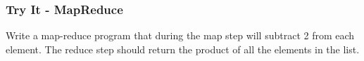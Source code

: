 \documentclass[xcolor=svgnames, handout]{beamer}
\newcommand{\red}[1]{\textcolor{red}{#1}}
\newcommand{\ft}[1]{\frametitle{#1}}
\begin{document}
%
%
%
%
%
%
%

\begin{frame}
\ft{Try It - MapReduce}
\begin{example}
Write a map-reduce program that during the map step will subtract 2 from each element.  The reduce step should return the product of all the elements in the list.
\end{example}

\end{frame}
\end{document}
